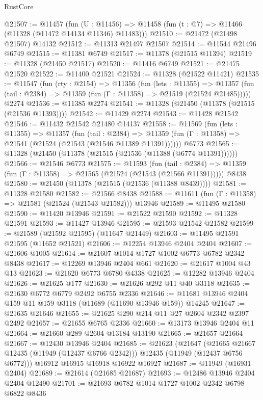 \begin{lexlean}{RustCore}
\begin{coremodule}
@21507 := @11457
    (fun (U : @11456) => @11458 (fun (t : @7) => @11466 (@11328 (@11472 @14134 @11346) @11483)))
@21510 := @21472 (@21498 @21507) @14132
@21512 := @11313 @21497 @21507
@21514 := @11544 @21496 @6749
@21515 := @11381 @6749
@21517 := @11378 (@21515 @11394)
@21519 := @11328 (@21450 @21517)
@21520 := @11416 @6749
@21521 := @21475 @21520
@21522 := @11400 @21521
@21524 := @11328 (@21522 @11421)
@21535 := @11547
    (fun (rty : @2154) =>
    @11356
      (fun (lets : @11355) =>
      @11357 (fun (tail : @2384) => @11359 (fun (Γ : @11358) => @21519 (@21524 @21485)))))
    @2274
@21536 := @11385 @2274
@21541 := @11328 (@21450 (@11378 (@21515 (@21536 @11393))))
@21542 := @11429 @2274
@21543 := @11428 @21542
@21546 := @11432 @21542 @21480 @14137
@21558 := @11569
    (fun (lets : @11355) =>
    @11357
      (fun (tail : @2384) =>
      @11359 (fun (Γ : @11358) => @21541 (@21524 (@21543 (@21546 @11389 @11391))))))
    @6773
@21565 := @11328 (@21450 (@11378 (@21515 (@21536 (@11388 (@6774 @11391))))))
@21566 := @21546 @6773
@21575 := @11593
    (fun (tail : @2384) => @11359 (fun (Γ : @11358) => @21565 (@21524 (@21543 (@21566 @11391)))))
    @8438
@21580 := @21450 (@11378 (@21515 (@21536 (@11388 @8439))))
@21581 := @11328 @21580
@21582 := @21566 @8438
@21588 := @11611 (fun (Γ : @11358) => @21581 (@21524 (@21543 @21582))) @13946
@21589 := @11495 @21580
@21590 := @11420 @13946
@21591 := @21522 @21590
@21592 := @11328 @21591
@21593 := @11427 @13946
@21595 := @21593 @21542 @21582
@21599 := @21589 (@21592 @21595) (@11647 @21449)
@21603 := @11495 @21591 @21595 (@11652 @21521)
@21606 := @12254 @13946 @2404 @2404
@21607 := @21606 @1005
@21614 := @21607 @1014 @1727 @1002 @6773 @6782 @2342 @8438
@21617 := @12269 @13946 @2404 @661
@21620 := @21617 @1004 @43 @13
@21623 := @21620 @6773 @6780 @4338
@21625 := @12282 @13946 @2404
@21626 := @21625 @177
@21630 := @21626 @292 @11 @40 @3118
@21635 := @21630 @6772 @6779 @2492 @6755 @2336
@21646 := @11681 @13946 @2404 @159 @11 @159 @3118 (@11689 (@11690 @13946 @159)) @14245
@21647 := @21635 @21646
@21655 := @21625 @290 @214 @11 @27 @2604 @2342 @2397 @2492
@21657 := @21655 @6765 @2336
@21660 := @13173 @13946 @2404 @11
@21664 := @21660 @289 @2604 @13184 @13190
@21665 := @21657 @21664
@21667 := @12430 @13946 @2404
@21685 := @21623
    (@21647
      (@21665 @21667 @12435 (@11949 (@12437 @6766 @2342)))
      @12435
      (@11949 (@12437 @6756 @6772)))
    @16912
    @16915
    @16918
    @16922
    @16927
@21687 := @11949 (@16931 @2404)
@21689 := @21614 (@21685 @21687)
@21693 := @12486 @13946 @2404 @2404 @12490
@21701 := @21693 @6782 @1014 @1727 @1002 @2342 @6798 @6822 @8436

\end{coremodule}
\end{lexlean}
